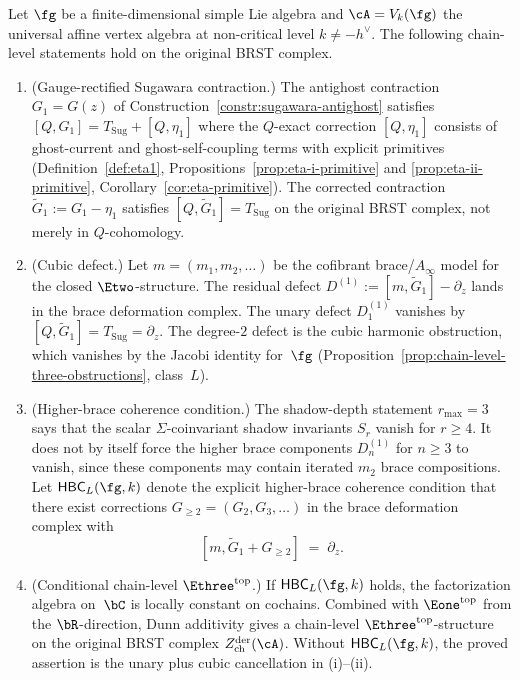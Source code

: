 \begin{proposition}
\label{prop:sugawara-gauge-rectification}%
%
%
%
\ClaimStatusConditional
Let $\fg$ be a finite-dimensional simple Lie algebra and
$\cA = V_k(\fg)$ the universal affine vertex algebra at
non-critical level $k \neq -h^\vee$. The following
chain-level statements hold on the original BRST complex.
\begin{enumerate}[label=\textup{(\roman*)}]
\item \textup{(Gauge-rectified Sugawara contraction.)}
 The antighost contraction $G_1 = G(z)$ of
 Construction~\textup{\ref{constr:sugawara-antighost}}
 satisfies
 $[Q, G_1] = T_{\mathrm{Sug}} + [Q, \eta_1]$
 where the $Q$-exact correction $[Q, \eta_1]$ consists
 of ghost-current and ghost-self-coupling terms with
 explicit primitives
 \textup{(}Definition~\textup{\ref{def:eta1}},
 Propositions~\textup{\ref{prop:eta-i-primitive}} and
 \textup{\ref{prop:eta-ii-primitive}},
 Corollary~\textup{\ref{cor:eta-primitive}}\textup{)}.
 The corrected contraction
 $\widetilde{G}_1 := G_1 - \eta_1$
 satisfies $[Q, \widetilde{G}_1] = T_{\mathrm{Sug}}$
 on the original BRST complex, not merely in
 $Q$-cohomology.
\item \textup{(Cubic defect.)}
 Let $m = (m_1, m_2, \ldots)$ be the cofibrant
 brace/$A_\infty$ model for the closed $\Etwo$-structure.
 The residual defect
 $D^{(1)} := [m, \widetilde{G}_1] - \partial_z$
 lands in the brace deformation complex.
 The unary defect $D^{(1)}_1$ vanishes by
 $[Q,\widetilde G_1]=T_{\mathrm{Sug}}=\partial_z$.
 The degree-$2$ defect is the cubic harmonic
 obstruction, which vanishes by the Jacobi identity
 for~$\fg$
 \textup{(}Proposition~\textup{\ref{prop:chain-level-three-obstructions}},
 class~$L$\textup{)}.
\item \textup{(Higher-brace coherence condition.)}
 The shadow-depth statement $r_{\max}=3$ says that the
 scalar $\Sigma$-coinvariant shadow invariants $S_r$
 vanish for $r\geq 4$. It does not by itself force the
 higher brace components $D^{(1)}_n$ for $n\geq 3$ to
 vanish, since these components may contain iterated $m_2$
 brace compositions. Let $\mathsf{HBC}_L(\fg,k)$ denote
 the explicit higher-brace coherence condition that there
 exist corrections $G_{\geq2}=(G_2,G_3,\ldots)$ in the
 brace deformation complex with
 \[
 [m,\widetilde G_1+G_{\geq2}] \;=\; \partial_z .
 \]
\item \textup{(Conditional chain-level $\Ethree^{\mathrm{top}}$.)}
 If $\mathsf{HBC}_L(\fg,k)$ holds, the factorization
 algebra on~$\bC$ is locally constant on cochains.
 Combined with $\Eone^{\mathrm{top}}$ from the
 $\bR$-direction, Dunn additivity gives a chain-level
 $\Ethree^{\mathrm{top}}$-structure on the original BRST
 complex $Z^{\mathrm{der}}_{\mathrm{ch}}(\cA)$.
 Without $\mathsf{HBC}_L(\fg,k)$, the proved assertion is
 the unary plus cubic cancellation in \textup{(i)--(ii)}.
\end{enumerate}
\end{proposition}

